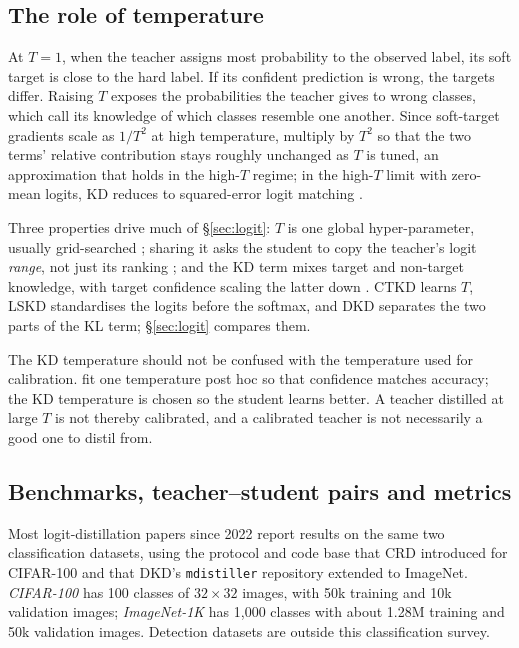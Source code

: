 \subsection{The role of temperature}
\label{sec:prelim-temperature}

At $T=1$, when the teacher assigns most probability to the observed label, its soft target is close to the hard label. If its confident prediction is wrong, the targets differ. Raising $T$ exposes the probabilities the teacher gives to wrong classes, which
\citet{hinton2015kd} call its knowledge of which classes resemble one another. Since soft-target
gradients scale as $1/T^2$ at high temperature, \citet{hinton2015kd} multiply by $T^2$ so that the two
terms' relative contribution stays roughly unchanged as $T$ is tuned, an approximation that holds in the
high-$T$ regime; in the high-$T$ limit with zero-mean logits, KD reduces
to squared-error logit matching \citep{hinton2015kd}.

Three properties drive much of \S\ref{sec:logit}: $T$ is one global hyper-parameter, usually grid-searched
\citep{li2023ctkd}; sharing it asks the student to copy the teacher's logit \emph{range}, not just its
ranking \citep{sun2024lskd}; and the KD term mixes target and non-target knowledge, with target
confidence scaling the latter down \citep{zhao2022dkd}.
CTKD learns $T$, LSKD standardises the logits before the softmax, and DKD separates the two parts of
the KL term; \S\ref{sec:logit} compares them.

The KD temperature should not be confused with the temperature used for calibration.
\citet{guo2017calibration} fit one temperature post hoc so that confidence matches accuracy; the KD
temperature is chosen so the student learns better. A teacher distilled at large $T$ is not thereby
calibrated, and a calibrated teacher is not necessarily a good one to distil from.

\subsection{Benchmarks, teacher--student pairs and metrics}
\label{sec:prelim-benchmarks}

Most logit-distillation papers since 2022 report results on the same two classification datasets, using the
protocol and code base that CRD \citep{tian2020crd} introduced for CIFAR-100 and that DKD's
\texttt{mdistiller} repository \citep{zhao2022dkd} extended to ImageNet.
\emph{CIFAR-100} has 100 classes of $32\times32$ images, with 50k
training and 10k validation images; \emph{ImageNet-1K} has 1{,}000
classes with about 1.28M training and 50k validation images. Detection datasets are outside this classification survey.



